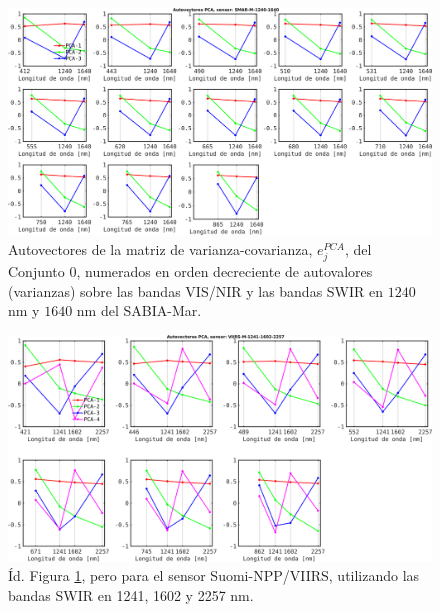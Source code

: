         \begin{figure}
        \centering
        \includegraphics[width=\textwidth]{pca/figures/PCAEigenVecSMAR_M_1240_1640.png}
        \caption[Autovectores PCA sobre las bandas VIS/NIR y las bandas SWIR en $1240$ nm y $1640$ nm del SABIA-Mar.]{Autovectores de la matriz de varianza-covarianza, $e_{j}^{PCA}$, del Conjunto $0$, numerados en orden decreciente de autovalores (varianzas) sobre las bandas VIS/NIR y las bandas SWIR en $1240$ nm y $1640$ nm del SABIA-Mar.}
        \label{pca:PCAEigenVecSMAR_M_1240_1640}
        \end{figure}

        \begin{figure}
        \centering
        \includegraphics[width=\textwidth]{pca/figures/PCAEigenVecVIIRS_M_1241_1602_2257.png}
        \caption[Autovectores PCA sobre las bandas VIS/NIR y las bandas SWIR en $1241$ nm, $1602$ nm y $2257$ nm de VIIRS.]{Íd. Figura \ref{pca:PCAEigenVecSMAR_M_1240_1640}, pero para el sensor Suomi-NPP/VIIRS, utilizando las bandas SWIR en 1241, 1602 y 2257 nm.} 
        \label{pca:PCAEigenVecVIIRS_M_1241_1602_2257}
        \end{figure}

